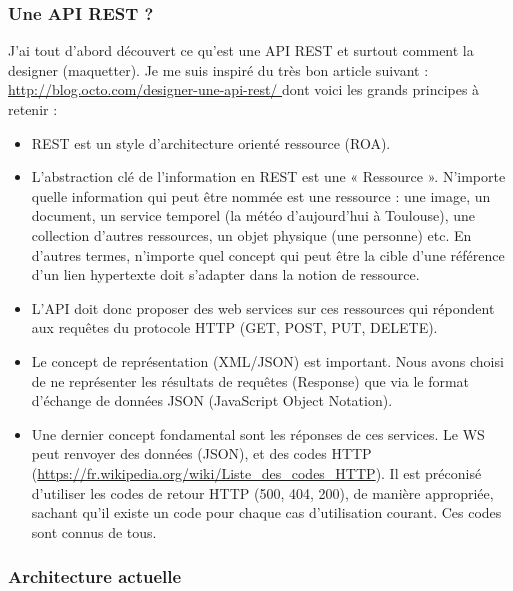 \subsubsection{Une API REST ?}

J'ai tout d'abord découvert ce qu'est une API REST et surtout comment la designer (maquetter). Je me suis inspiré du très bon article suivant :\\
\url{http://blog.octo.com/designer-une-api-rest/ } dont voici les grands principes à retenir :

\begin{itemize}
\item REST est un style d'architecture orienté ressource (ROA).
\item L'abstraction clé de l'information en REST est une « Ressource ». N'importe quelle information qui peut être nommée est une ressource : une image, un document, un service temporel (la météo d'aujourd'hui à Toulouse), une collection d'autres ressources, un objet physique (une personne) etc. En d'autres termes, n'importe quel concept qui peut être la cible d'une référence d'un lien hypertexte doit s'adapter dans la notion de ressource.
\item L'API doit donc proposer des web services sur ces ressources qui répondent aux requêtes du protocole HTTP (GET, POST, PUT, DELETE).
\item Le concept de représentation (XML/JSON) est important. Nous avons choisi de ne représenter les résultats de requêtes (Response) que via le format d'échange de données JSON (JavaScript Object Notation).
\item Une dernier concept fondamental sont les réponses de ces services. Le WS peut renvoyer des données (JSON), et des codes HTTP (\url{https://fr.wikipedia.org/wiki/Liste_des_codes_HTTP}). Il est préconisé d'utiliser les codes de retour HTTP (500, 404, 200), de manière appropriée, sachant qu'il existe un code pour chaque cas d'utilisation courant. Ces codes sont connus de tous. 
\end{itemize}

\subsubsection{Architecture actuelle}

